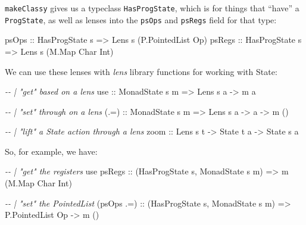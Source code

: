 \documentclass[]{article}
\newenvironment{Shaded}{}{}
\newcommand{\CommentTok}[1]{\textcolor[rgb]{0.38,0.63,0.69}{\textit{#1}}}
\newcommand{\DataTypeTok}[1]{\textcolor[rgb]{0.56,0.13,0.00}{#1}}
\newcommand{\NormalTok}[1]{#1}
\newcommand{\OperatorTok}[1]{\textcolor[rgb]{0.40,0.40,0.40}{#1}}
\newcommand{\OtherTok}[1]{\textcolor[rgb]{0.00,0.44,0.13}{#1}}
\begin{document}
\texttt{makeClassy} gives us a typeclass \texttt{HasProgState}, which is for
things that ``have'' a \texttt{ProgState}, as well as lenses into the
\texttt{psOps} and \texttt{psRegs} field for that type:

\begin{Shaded}
\begin{Highlighting}[]
\OtherTok{psOps  ::} \DataTypeTok{HasProgState}\NormalTok{ s }\OtherTok{=\textgreater{}} \DataTypeTok{Lens\textquotesingle{}}\NormalTok{ s (}\DataTypeTok{P.PointedList} \DataTypeTok{Op}\NormalTok{)}
\OtherTok{psRegs ::} \DataTypeTok{HasProgState}\NormalTok{ s }\OtherTok{=\textgreater{}} \DataTypeTok{Lens\textquotesingle{}}\NormalTok{ s (}\DataTypeTok{M.Map} \DataTypeTok{Char} \DataTypeTok{Int}\NormalTok{)}
\end{Highlighting}
\end{Shaded}

We can use these lenses with \emph{lens} library functions for working with
State:

\begin{Shaded}
\begin{Highlighting}[]
\CommentTok{{-}{-} | "get" based on a lens}
\OtherTok{use   ::} \DataTypeTok{MonadState}\NormalTok{ s m }\OtherTok{=\textgreater{}} \DataTypeTok{Lens\textquotesingle{}}\NormalTok{ s a }\OtherTok{{-}\textgreater{}}\NormalTok{ m a}

\CommentTok{{-}{-} | "set" through on a lens}
\OtherTok{(.=)  ::} \DataTypeTok{MonadState}\NormalTok{ s m }\OtherTok{=\textgreater{}} \DataTypeTok{Lens\textquotesingle{}}\NormalTok{ s a }\OtherTok{{-}\textgreater{}}\NormalTok{ a }\OtherTok{{-}\textgreater{}}\NormalTok{ m ()}

\CommentTok{{-}{-} | "lift" a State action through a lens}
\OtherTok{zoom  ::} \DataTypeTok{Lens\textquotesingle{}}\NormalTok{ s t }\OtherTok{{-}\textgreater{}} \DataTypeTok{State}\NormalTok{ t a }\OtherTok{{-}\textgreater{}} \DataTypeTok{State}\NormalTok{ s a}
\end{Highlighting}
\end{Shaded}

So, for example, we have:

\begin{Shaded}
\begin{Highlighting}[]
\CommentTok{{-}{-} | "get" the registers}
\NormalTok{use}\OtherTok{ psRegs ::}\NormalTok{ (}\DataTypeTok{HasProgState}\NormalTok{ s, }\DataTypeTok{MonadState}\NormalTok{ s m) }\OtherTok{=\textgreater{}}\NormalTok{ m (}\DataTypeTok{M.Map} \DataTypeTok{Char} \DataTypeTok{Int}\NormalTok{)}

\CommentTok{{-}{-} | "set" the PointedList}
\NormalTok{(psOps }\OperatorTok{.=}\NormalTok{)}\OtherTok{ ::}\NormalTok{ (}\DataTypeTok{HasProgState}\NormalTok{ s, }\DataTypeTok{MonadState}\NormalTok{ s m) }\OtherTok{=\textgreater{}} \DataTypeTok{P.PointedList} \DataTypeTok{Op} \OtherTok{{-}\textgreater{}}\NormalTok{ m ()}
\end{Highlighting}
\end{Shaded}
\end{document}
